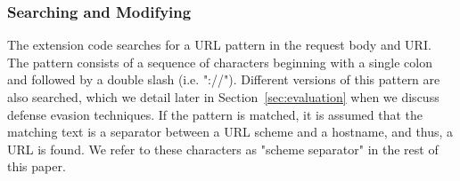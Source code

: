 

\subsubsection{Searching and Modifying}
The extension code searches for a URL pattern in the request body and URI. The pattern consists of a sequence of characters beginning with a single colon and followed by a double slash (i.e. "://"). Different versions of this pattern are also searched, which we detail later in Section~\ref{sec:evaluation} when we discuss defense evasion techniques.
If the pattern is matched, it is assumed that the matching text is a separator between a URL scheme and a hostname, and thus, a URL is found. We refer to these characters as "scheme separator" in the rest of this paper. %


